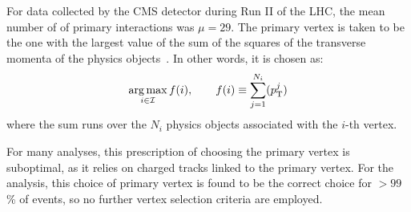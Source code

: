 For data collected by the CMS detector during Run II of the LHC, the mean number of of primary interactions was $\mu = 29$. 
The primary vertex is taken to be the one with the largest value of the sum of the squares of the transverse momenta of the physics objects~\cite{Contardo:2020886}.
In other words, it is chosen as:
\begin{equation}
    \operatorname*{arg\,max}_{i \in \mathcal I} f(i), \qquad f(i) \equiv \sum_{j=1}^{N_i} (p_{\mathrm{T}}^j)
\end{equation}
where the sum runs over the $N_i$ physics objects associated with the $i$-th vertex.

For many \Hgg analyses, this prescription of choosing the primary vertex is suboptimal, as it relies on charged tracks linked to the primary vertex.
For the \ttH analysis, this choice of primary vertex is found to be the correct choice for $>99$\% of \ttH events, so no further vertex selection criteria are employed. %
